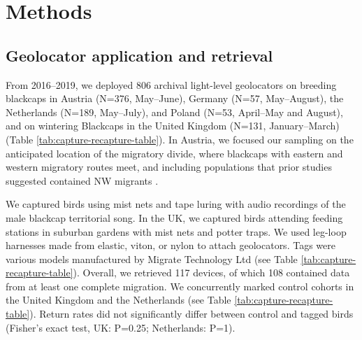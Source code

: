 \documentclass[a4paper, nobind]{templates/ociamthesis}
\begin{document}
\hypertarget{methods}{%
\section{Methods}\label{methods}}

\hypertarget{geolocator-application-and-retrieval}{%
\subsection{Geolocator application and retrieval}\label{geolocator-application-and-retrieval}}

From 2016--2019, we deployed 806 archival light-level geolocators on breeding blackcaps in Austria (N=376, May--June), Germany (N=57, May--August), the Netherlands (N=189, May--July), and Poland (N=53, April--May and August), and on wintering Blackcaps in the United Kingdom (N=131, January--March) (Table \ref{tab:capture-recapture-table}). In Austria, we focused our sampling on the anticipated location of the migratory divide, where blackcaps with eastern and western migratory routes meet, and including populations that prior studies suggested contained NW migrants \autocite{helbigPopulationDifferentiationMigratory1992,helbigSESWmigratingBlackcap1991}.

We captured birds using mist nets and tape luring with audio recordings of the male blackcap territorial song. In the UK, we captured birds attending feeding stations in suburban gardens with mist nets and potter traps. We used leg-loop harnesses \autocite{rappoleNewHarnessDesign1991} made from elastic, viton, or nylon to attach geolocators. Tags were various models manufactured by Migrate Technology Ltd (see Table \ref{tab:capture-recapture-table}). Overall, we retrieved 117 devices, of which 108 contained data from at least one complete migration. We concurrently marked control cohorts in the United Kingdom and the Netherlands (see Table \ref{tab:capture-recapture-table}). Return rates did not significantly differ between control and tagged birds (Fisher's exact test, UK: P=0.25; Netherlands: P=1).
\end{document}
